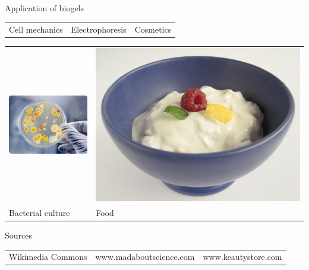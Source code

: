 \documentclass[xcolor=table]{beamer}
\begin{document}
\begin{frame}{Application of biogels}
\begin{tabu}{cX[c]c}
Cell mechanics & Electrophoresis & Cosmetics\\
\end{tabu}
\begin{tabu}{X[c]X[c]}
\includegraphics[height=0.3\textheight]{bacterial_culture} &
\includegraphics[height=0.3\textheight]{food} \\
Bacterial culture & Food\\
\end{tabu}

\begin{footnotesize}
\begin{block}{Sources}
\begin{tabu}{lXl}
Wikimedia Commons & www.madaboutscience.com & www.keautystore.com\\
\end{tabu}
\end{block}
\end{footnotesize}
\end{frame}
\end{document}
